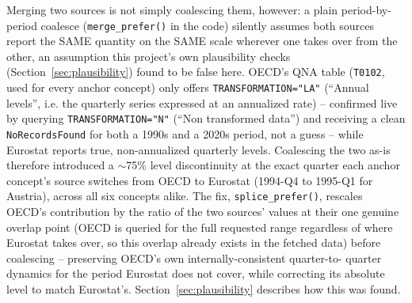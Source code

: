 \documentclass[11pt]{article}
\begin{document}
Merging two sources is not simply coalescing them, however: a plain
period-by-period coalesce (\texttt{merge\_prefer()} in the code) silently
assumes both sources report the SAME quantity on the SAME scale wherever
one takes over from the other, an assumption this project's own
plausibility checks (Section~\ref{sec:plausibility}) found to be false
here. OECD's QNA table (\texttt{T0102}, used for every anchor concept)
only offers \texttt{TRANSFORMATION=\allowbreak{}"LA"} (``Annual
levels'', i.e. the quarterly series expressed at an annualized rate) --
confirmed live by querying \texttt{TRANSFORMATION=\allowbreak{}"N"}
(``Non transformed data'') and receiving a clean \texttt{NoRecordsFound}
for both a 1990s and a 2020s period, not a guess -- while Eurostat
reports true, non-annualized quarterly levels. Coalescing the two as-is
therefore introduced a $\sim$75\% level discontinuity at the exact
quarter each anchor concept's source switches from OECD to Eurostat
(1994-Q4 to 1995-Q1 for Austria), across all six concepts alike. The fix,
\texttt{splice\_prefer()}, rescales OECD's contribution by the ratio of
the two sources' values at their one genuine overlap point (OECD is
queried for the full requested range regardless of where Eurostat takes
over, so this overlap already exists in the fetched data) before
coalescing -- preserving OECD's own internally-consistent quarter-to-
quarter dynamics for the period Eurostat does not cover, while correcting
its absolute level to match Eurostat's. Section~\ref{sec:plausibility}
describes how this was found.
\end{document}
